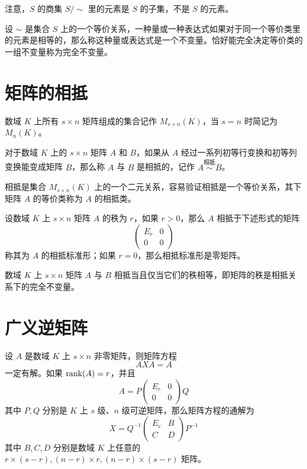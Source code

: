 注意，$S$ 的商集 $S/\sim$ 里的元素是 $S$ 的子集，不是 $S$ 的元素。

设 $\sim$ 是集合 $S$ 上的一个等价关系，一种量或一种表达式如果对于同一个等价类里的元素是相等的，那么称这种量或表达式是一个不变量。恰好能完全决定等价类的一组不变量称为完全不变量。

\section{矩阵的相抵}

数域 $K$ 上所有 $s\times n$ 矩阵组成的集合记作 $M_{s\times n}(K)$，当 $s=n$ 时简记为 $M_n(K)$。

\begin{definition}
    对于数域 $K$ 上的 $s\times n$ 矩阵 $A$ 和 $B$，如果从 $A$ 经过一系列初等行变换和初等列变换能变成矩阵 $B$，那么称 $A$ 与 $B$ 是相抵的，记作 $A\overset{\text{相抵}}{\sim}B$。
\end{definition}

相抵是集合 $M_{s\times n}(K)$ 上的一个二元关系，容易验证相抵是一个等价关系，其下矩阵 $A$ 的等价类称为 $A$ 的相抵类。

\begin{theorem}
    设数域 $K$ 上 $s\times n$ 矩阵 $A$ 的秩为 $r$，如果 $r>0$，那么 $A$ 相抵于下述形式的矩阵
    \[\left(\begin{matrix}
        E_r & 0\\
        0   & 0
    \end{matrix}\right)\]
    称其为 $A$ 的相抵标准形；如果 $r=0$，那么相抵标准形是零矩阵。
\end{theorem}

\begin{theorem}
    数域 $K$ 上 $s\times n$ 矩阵 $A$ 与 $B$ 相抵当且仅当它们的秩相等，即矩阵的秩是相抵关系下的完全不变量。
\end{theorem}

\section{广义逆矩阵}

\begin{theorem}
    设 $A$ 是数域 $K$ 上 $s\times n$ 非零矩阵，则矩阵方程
    \[AXA = A\]
    一定有解。如果 $\operatorname{rank}(A) = r$，并且
    \[A = P\left(\begin{matrix}
        E_r & 0\\
        0   & 0
    \end{matrix}\right)Q\]
    其中 $P,Q$ 分别是 $K$ 上 $s$ 级、$n$ 级可逆矩阵，那么矩阵方程的通解为
    \[X = Q^{-1}\left(\begin{matrix}
        E_r & B\\
        C   & D
    \end{matrix}\right)P^{-1}\]
    其中 $B,C,D$ 分别是数域 $K$ 上任意的 $r\times (s-r),(n-r)\times r,(n-r)\times (s-r)$ 矩阵。
\end{theorem}

